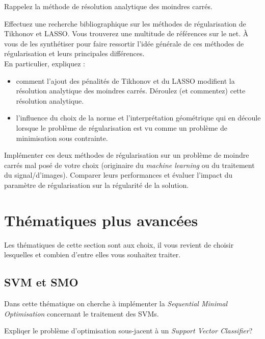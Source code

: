 \documentclass[11pt, a4paper]{article}
\begin{document}
\begin{question}
Rappelez la méthode de résolution analytique des moindres carrés.
\end{question}

\begin{question}
  Effectuez une recherche bibliographique sur les méthodes de régularisation de Tikhonov et LASSO. Vous trouverez une multitude de références sur le net. À vous de les synthétiser pour faire ressortir l'idée générale de ces méthodes de régularisation et leurs principales différences.\\
  En particulier, expliquez :
  \begin{itemize}
  \item comment l'ajout des pénalités de Tikhonov et du LASSO modifient la résolution analytique des moindres carrés. Déroulez (et commentez) cette résolution analytique.
  \item l'influence du choix de la norme et l'interprétation géométrique qui en découle lorsque le problème de régularisation est vu comme un problème de minimisation sous contrainte.
  \end{itemize}
\end{question}

\begin{question}
Implémenter ces deux méthodes de régularisation sur un problème de moindre carrés mal posé de votre choix (originaire du \textit{machine learning} ou du traitement du signal/d'images). Comparer leurs performances et évaluer l'impact du paramètre de régularisation sur la régularité de la solution.
\end{question}


\section{Thématiques plus avancées}

Les thématiques de cette section sont aux choix, il vous revient de
choisir lesquelles et combien d'entre elles vous souhaitez traiter.

\subsection{SVM et SMO}

Dans cette thématique on cherche à implémenter la \emph{Sequential
  Minimal Optimisation} concernant le traitement des SVMs.

\begin{question}
  Expliqer le problème d'optimisation sous-jacent à un \emph{Support
    Vector Classifier}?
\end{question}
\end{document}
